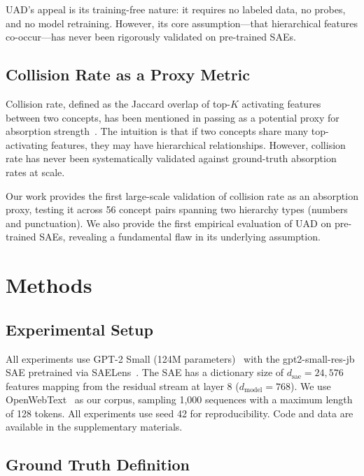 \documentclass{article}
\begin{document}
UAD's appeal is its training-free nature: it requires no labeled data, no probes, and no model retraining. However, its core assumption---that hierarchical features co-occur---has never been rigorously validated on pre-trained SAEs.

\subsection{Collision Rate as a Proxy Metric}

Collision rate, defined as the Jaccard overlap of top-$K$ activating features between two concepts, has been mentioned in passing as a potential proxy for absorption strength~\citep{chanin2024absorption}. The intuition is that if two concepts share many top-activating features, they may have hierarchical relationships. However, collision rate has never been systematically validated against ground-truth absorption rates at scale.

Our work provides the first large-scale validation of collision rate as an absorption proxy, testing it across 56 concept pairs spanning two hierarchy types (numbers and punctuation). We also provide the first empirical evaluation of UAD on pre-trained SAEs, revealing a fundamental flaw in its underlying assumption.

\section{Methods}
\label{sec:methods}

\subsection{Experimental Setup}

All experiments use GPT-2 Small (124M parameters)~\citep{radford2019language} with the gpt2-small-res-jb SAE pretrained via SAELens~\citep{templeton2024scaling}. The SAE has a dictionary size of $d_{\text{sae}} = 24{,}576$ features mapping from the residual stream at layer 8 ($d_{\text{model}} = 768$). We use OpenWebText~\citep{gokaslan2019openwebtext} as our corpus, sampling 1,000 sequences with a maximum length of 128 tokens. All experiments use seed 42 for reproducibility. Code and data are available in the supplementary materials.

\subsection{Ground Truth Definition}
\end{document}
